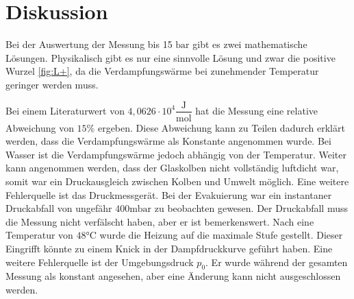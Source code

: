 \section{Diskussion}
\label{sec:Diskussion}
Bei der Auswertung der Messung bis 15 $\unit{\bar}$ gibt es zwei mathematische Lösungen. Physikalisch gibt es nur eine sinnvolle Lösung und zwar die positive Wurzel \autoref{fig:L+}, da die Verdampfungswärme bei zunehmender Temperatur geringer werden muss. 

Bei einem Literaturwert von ${4,0626} \cdot 10^4 \dfrac{\unit{\joule}}{\unit{\mol}}$ \cite{chemiede} hat die Messung eine relative Abweichung von $15\%$ ergeben.
Diese Abweichung kann zu Teilen dadurch erklärt werden, dass die Verdampfungswärme als Konstante angenommen wurde.
Bei Wasser ist die Verdampfungswärme jedoch abhängig von der Temperatur.
Weiter kann angenommen werden, dass der Glaskolben nicht vollständig luftdicht war, somit war ein Druckausgleich zwischen Kolben und Umwelt möglich.
Eine weitere Fehlerquelle ist das Druckmessgerät. Bei der Evakuierung war ein instantaner Druckabfall von ungefähr $400 \unit{\milli\bar}$ zu beobachten gewesen.
Der Druckabfall muss die Messung nicht verfälscht haben, aber er ist bemerkenswert.
Nach eine Temperatur von $48 \unit{\celsius}$ wurde die Heizung auf die maximale Stufe gestellt. Dieser Eingrifft könnte zu einem Knick in der Dampfdruckkurve geführt haben.
Eine weitere Fehlerquelle ist der Umgebungsdruck $p_0$. Er wurde während der gesamten Messung als konstant angesehen, aber eine Änderung kann nicht ausgeschlossen werden.
